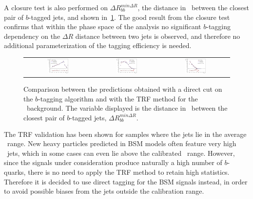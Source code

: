 A closure test is also performed on $\Delta R_{bb}^{min \Delta R}$, the distance in \DR\ between the closest pair of $b$-tagged jets, and shown in~\ref{fig:TRFclos_dR}. 
The good result from the closure test confirms that  within the phase space of the analysis no significant $b$-tagging dependency on the $\Delta R$ distance between two jets is observed, and therefore no additional parameterization of the tagging efficiency is needed.

\begin{figure}[!t]
\begin{center}
  \begin{tabular}{@{}c@{}c@{}c@{}}
\includegraphics[width=0.33\textwidth]{Modeling/Figures/plots_trf/tt_6jetin_2btagex_MinDR_bb} &
\includegraphics[width=0.33\textwidth]{Modeling/Figures/plots_trf/tt_6jetin_3btagex_MinDR_bb} & %
\includegraphics[width=0.33\textwidth]{Modeling/Figures/plots_trf/tt_6jetin_4btagin_MinDR_bb} \\  
\end{tabular}
\end{center}
\caption{
  Comparison between the predictions obtained with a direct cut on the $b$-tagging algorithm and with the TRF method for the \ttbar\ background. The variable displayed is the distance in \DR\ between the closest pair of $b$-tagged jets, $\Delta R_{bb}^{min \Delta R}$. }
\label{fig:TRFclos_dR}
\end{figure}

The TRF validation has been shown for samples where the jets lie in the average \pt\ range. New heavy particles predicted in BSM models often feature very high \pt\ jets, which in some cases can even lie above the calibrated \pt\ range. However, since the signals under consideration produce naturally a high number of $b$-quarks, there is no need to apply the TRF method to retain high statistics. Therefore it is decided to use direct tagging for the BSM signals instead, in order to avoid possible biases from the jets outside the calibration range.

